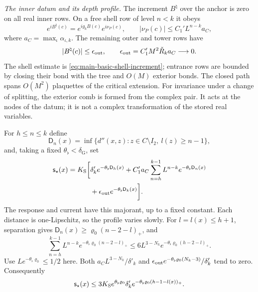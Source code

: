 \documentclass[11pt,letterpaper,reqno]{amsart}
\theoremstyle{definition}
\theoremstyle{remark}
\begin{document}
\emph{The inner datum and its depth profile.}
The increment \(B^\natural\) over the anchor is zero
on all real inner rows. On a free shell row of level
\(n<k\) it obeys
\[
 e^{iB^\natural(c)}=e^{ig_kB(c)}e^{i\nu_P(c)},\qquad
 |\nu_P(c)|\le C_1'L^{n-k}a_C,
\]
where \(a_C=\max_\iota\alpha_{\iota,k}\).
The remaining outer and tower rows have
\[
 |B^\natural(c)|\le\epsilon_{\rm out},
 \qquad \epsilon_{\rm out}=C_1'M^2\check R_k a_C\longrightarrow0.
\]
The shell estimate is
\eqref{eq:main-basic-shell-increment}; entrance rows
are bounded by closing their bond with the tree and
\(O(M)\) exterior bonds. The closed path spans
\(O(M^2)\) plaquettes of the critical extension.
For invariance under a change of splitting, the
exterior comb is formed from the complex pair.
It acts at the nodes of the datum; it is not a
complex transformation of the stored real variables.

For \(h\le n\le k\) define
\[
 \mathsf D_n(x)=
   \inf\{d''(x,z):z\in C\setminus I_2,\ l(z)\ge n-1\},
\]
and, taking a fixed \(\theta_\flat<\delta_{\mathrm G}\), set
\[
 \begin{split}
 \mathsf s_\star(x)=K_{\rm S}\bigg[
 &\delta'_ke^{-\theta_\flat\mathsf D_h(x)}
 +C_1'a_C\sum_{n=h}^{k-1}
                 L^{n-k}e^{-\theta_\flat\mathsf D_n(x)}\\
 &+\epsilon_{\rm out}e^{-\theta_\flat\mathsf D_k(x)}
 \bigg].
 \end{split}
\]
The response and current have this majorant, up to a
fixed constant. Each distance is one-Lipschitz, so the
profile varies slowly. For \(l=l(x)\le h+1\), separation
gives \(\mathsf D_n(x)\ge\varrho_0(n-2-l)_+\), and
\[
 \sum_{n=h}^{k-1}L^{n-k}
        e^{-\theta_\flat\varrho_0(n-2-l)_+}
 \le6L^{3-N_k}
              e^{-\theta_\flat\varrho_0(h-2-l)_+}.
\]
Use \(Le^{-\theta_\flat\varrho_0}\le1/2\) here.
Both
\(a_CL^{3-N_k}/\delta'_k\) and
\(\epsilon_{\rm out}e^{-\theta_\flat\varrho_0(N_k-3)}
 /\delta'_k\) tend to zero. Consequently
\begin{equation}\label{eq:anchor-response-profile}
 \mathsf s_\star(x)\le
       3K_{\rm S}e^{\theta_\flat\varrho_0}\delta'_k
             e^{-\theta_\flat\varrho_0(h-1-l(x))_+}.
\end{equation}
\end{document}
